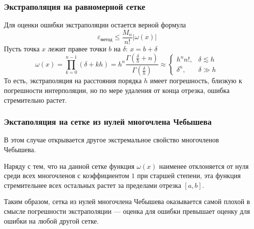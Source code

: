 \documentclass[aspectratio=43,unicode]{beamer}
\begin{document}
\begin{frame}
\frametitle{Экстраполяция на равномерной сетке}
	Для оценки ошибки экстраполяции остается верной формула
	\[
	\varepsilon_{\text{метод}} \leqslant \frac{M_n}{n!} |\omega(x)|
	\]
	Пусть точка $x$ лежит правее точки $b$ на $\delta$: $x = b + \delta$
	\[
	\omega(x) = \prod_{k=0}^{n-1} \left(\delta+kh\right) =
		h^n\frac{\Gamma\left(\frac{\delta}{h}+n\right)}{\Gamma\left(\frac{\delta}{h}\right)}
	\approx
	\begin{cases}
		h^n n!,& \delta \lesssim h\\
		\delta^n,& \delta \gg h
	\end{cases}
	\]
	То есть, экстраполяция на расстояния порядка $h$ имеет погрешность, близкую к погрешности интерполяции,
	но по мере удаления от конца отрезка, ошибка стремительно растет.
\end{frame}

\begin{frame}
\frametitle{Экстаполяция на сетке из нулей многочлена Чебышева}
	В этом случае открывается другое экстремальное свойство многочленов Чебышева.
	\pause

	Наряду с тем, что на данной сетке функция $\omega(x)$ наименее отклоняется от нуля
	среди всех многочленов с коэффициентом $1$ при старшей степени, эта функция
	стремительнее всех остальных растет за пределами отрезка $[a,b]$.
	\pause

	Таким образом, сетка из нулей многочлена Чебышева оказывается самой плохой
	в смысле погрешности экстраполяции --- оценка для ошибки превышает оценку
	для ошибки на любой другой сетке.
\end{frame}
\end{document}
